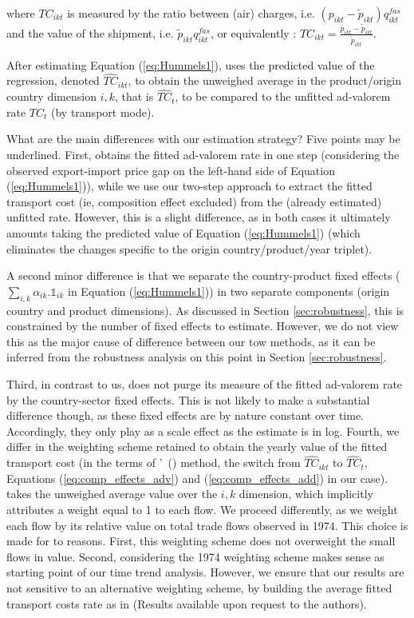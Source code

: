 \documentclass[a4paper,11pt]{article}
\newcommand\citeh[1]{\citeauthor{#1}'\ (\citeyear{#1})}
\begin{document}
\noindent where $TC_{ikt}$ is measured by the ratio between (air) charges, i.e. $(p_{ikt} - \widetilde{p}_{ikt})q^{fas}_{ikt}$ and the value of the shipment, i.e. $\widetilde{p}_{ikt}q^{fas}_{ikt}$, or equivalently : $TC_{ikt} = \frac{p_{ikt} - \widetilde{p}_{ikt}}{\widetilde{p}_{ikt}}$.\medskip

After estimating Equation (\ref{eq:Hummels1}), \cite{hummels2007} uses the predicted value of the regression, denoted $\widehat{TC}_{ikt}$, to obtain the unweighed average in the product/origin country dimension $i,k$, that is $\widehat{TC}_{t}$, to be compared to the unfitted ad-valorem rate $TC_{t}$ (by transport mode).\medskip

What are the main differences with our estimation strategy? Five points may be underlined. First, \cite{hummels2007} obtains the fitted ad-valorem rate in one step (considering the observed export-import price gap on the left-hand side of Equation (\ref{eq:Hummels1})), while we use our two-step approach to extract the fitted transport cost (ie, composition effect excluded) from the (already estimated) unfitted rate. However, this is a slight difference, as in both cases it ultimately amounts taking the predicted value of Equation (\ref{eq:Hummels1}) (which eliminates the changes specific to the origin country/product/year triplet).

A second minor difference is that we separate the country-product fixed effects ($\sum_{i,k}\alpha_{ik}.\mathbb{1}_{ik}$ in Equation (\ref{eq:Hummels1})) in two separate components (origin country and product dimensions). As discussed in Section \ref{sec:robustness}, this is constrained by the number of fixed effects to estimate. However, we do not view this as the major cause of difference between our tow methods, as it can be inferred from the robustness analysis on this point in Section \ref{sec:robustness}.

Third, in contrast to us, \cite{hummels2007} does not purge its measure of the fitted ad-valorem rate by the country-sector fixed effects. This is not likely to make a substantial difference though, as these fixed effects are by nature constant over time. Accordingly, they only play as a scale effect as the estimate is in log. Fourth, we differ in the weighting scheme retained to obtain the yearly value of the fitted transport cost (in the terms of \citeh{hummels2007} method, the switch from $\widehat{TC}_{ikt}$ to $\widehat{TC}_{t}$, Equations (\ref{eq:comp_effects_adv}) and (\ref{eq:comp_effects_add}) in our case). \cite{hummels2007} takes the unweighed average value over the $i,k$ dimension, which implicitly attributes a weight equal to 1 to each flow. We proceed differently, as we weight each flow by its relative value on total trade flows observed in 1974. This choice is made for to reasons. First, this weighting scheme does not overweight the small flows in value. Second, considering the 1974 weighting scheme makes sense as starting point of our time trend analysis. However, we ensure that our results are not sensitive to an alternative weighting scheme, by building the average fitted transport costs rate as in \cite{hummels2007} (Results available upon request to the authors).
\end{document}
